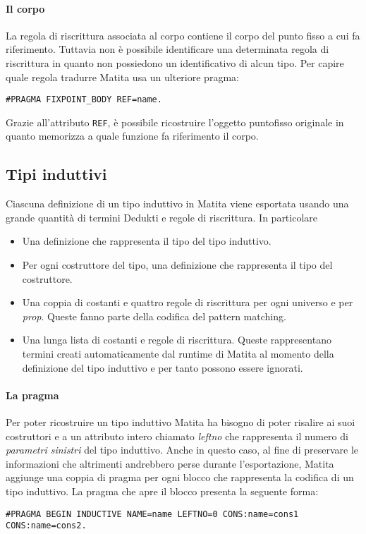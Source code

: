 \documentclass[12pt,a4paper]{mimosis}
\begin{document}
\paragraph{Il corpo}
La regola di riscrittura associata al corpo contiene il corpo del punto fisso
a cui fa riferimento. Tuttavia non è possibile identificare una determinata
regola di riscrittura in quanto non possiedono un identificativo di alcun 
tipo. Per capire quale regola tradurre Matita usa un ulteriore pragma:
\begin{center}
  \texttt{\#PRAGMA FIXPOINT\_BODY REF=name.}
\end{center}

Grazie all'attributo \texttt{REF}, è possibile ricostruire l'oggetto puntofisso originale
in quanto memorizza a quale funzione fa riferimento il corpo.

\subsection{Tipi induttivi}\label{sottoSezioneTipiInduttivi}
Ciascuna definizione di un tipo induttivo in Matita viene esportata usando
una grande quantità di termini Dedukti e regole di riscrittura. In particolare
\begin{itemize}
  \item Una definizione che rappresenta il tipo del tipo induttivo.
  \item Per ogni costruttore del tipo, una definizione che rappresenta il
    tipo del costruttore.
  \item Una coppia di costanti e quattro regole di riscrittura per ogni universo
    e per \textit{prop}. Queste fanno parte della codifica del pattern matching.
  \item Una lunga lista di costanti e regole di riscrittura. Queste rappresentano
    termini creati automaticamente dal runtime di Matita al momento della
    definizione del tipo induttivo e per tanto possono essere ignorati.
\end{itemize}

\paragraph{La pragma}
Per poter ricostruire un tipo induttivo Matita ha bisogno di poter risalire
ai suoi costruttori e a un attributo intero chiamato \textit{leftno} che 
rappresenta il numero di \textit{parametri sinistri} del tipo induttivo.
Anche in questo caso, al fine di preservare le informazioni che altrimenti
andrebbero perse durante l'esportazione, Matita aggiunge una coppia di pragma
per ogni blocco che rappresenta la codifica di un tipo induttivo.
La pragma che apre il blocco presenta la seguente forma:
\begin{center}
  \texttt{\#PRAGMA BEGIN INDUCTIVE NAME=name LEFTNO=0 CONS:name=cons1 CONS:name=cons2.}
\end{center}
\end{document}
